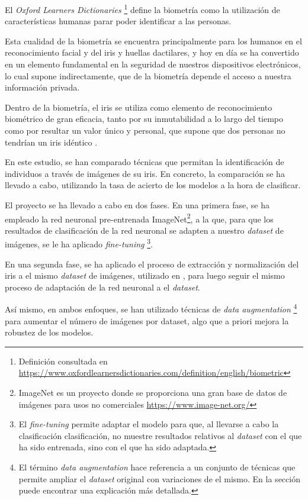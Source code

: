 
El \textit{Oxford Learners Dictionaries} \footnote{Definición consultada en \url{https://www.oxfordlearnersdictionaries.com/definition/english/biometric}} define la biometría como la utilización de características humanas parar poder identificar a las personas.

Esta cualidad de la biometría se encuentra principalmente para los humanos en el reconocimiento facial y del iris y huellas dactilares, y hoy en día
se ha convertido en un elemento fundamental en la seguridad de nuestros dispositivos electrónicos, lo cual supone indirectamente,
que de la biometría depende el acceso a nuestra información privada.

Dentro de la biometría, el iris se utiliza como elemento de reconocimiento biométrico de gran eficacia, tanto por su inmutabilidad a lo largo del tiempo como por resultar un valor único y 
personal, que supone que dos personas no tendrían un iris idéntico \cite{malgheet_iris_2021}. 

En este estudio, se han comparado técnicas que permitan la identificación de individuos a través de imágenes de su iris. 
En concreto, la comparación se ha llevado a cabo, utilizando la tasa de acierto de los modelos a la hora de clasificar. 

El proyecto se ha llevado a cabo en dos fases. En una primera fase, se ha empleado la red neuronal pre-entrenada ImageNet\footnote{ImageNet es un proyecto donde se proporciona 
una gran base de datos de imágenes para usos no comerciales \url{https://www.image-net.org/}}, a la que, para que los resultados de clasificación de la red neuronal se adapten a nuestro \textit{dataset} de imágenes, se le ha aplicado \textit{fine-tuning} \footnote{El \textit{fine-tuning} 
permite adaptar el modelo para que, al llevarse a cabo la clasificación clasificación, no muestre resultados relativos al \textit{dataset} con el que ha sido entrenada, sino con el que ha sido adaptada.}.

En una segunda fase, se ha aplicado el proceso de extracción y normalización del iris a el mismo \textit{dataset} de imágenes, utilizado en \cite{tfg_iris_2020}, para luego seguir el mismo proceso de adaptación de la red neuronal
a el \textit{dataset}.

Así mismo, en ambos enfoques, se han utilizado técnicas de \textit{data augmentation} \footnote{El término \textit{data augmentation} hace referencia a un conjunto de técnicas que permite ampliar el \textit{dataset} original con variaciones de el mismo. En la sección  puede encontrar una explicación más detallada.} para aumentar el número de imágenes por dataset, algo que a priori mejora la robustez de los modelos.

